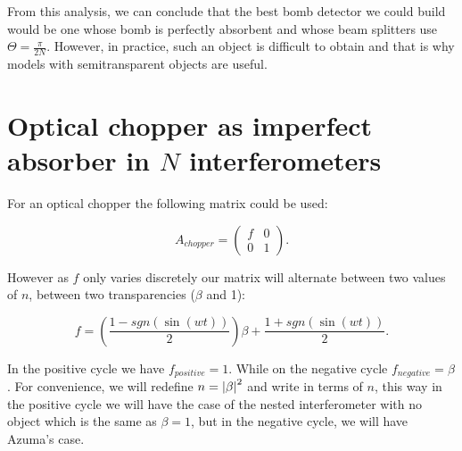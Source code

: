 \documentclass{book}
\begin{document}
From this analysis, we can conclude that the best bomb detector we could build would be one whose bomb is perfectly absorbent and whose beam splitters use $\Theta=\frac{\pi}{2 N}$. However, in practice, such an object is difficult to obtain and that is why models with semitransparent objects are useful.
 
\section[Optical chopper]{Optical chopper as imperfect absorber in $N$ interferometers}
For an optical chopper the following matrix could be used:

\begin{equation}
A_{chopper}=\begin{pmatrix} f & 0 \\ 0 & 1 \end{pmatrix}.
\end{equation}

However as $f$ only varies discretely our matrix will alternate between two values of $n$, between two transparencies ($\beta$ and 1):

\begin{equation}
f=\left(\frac{1-sgn(\sin(wt))}{2} \right)\beta+\frac{1+sgn(\sin(wt))}{2}.
\end{equation}

In the positive cycle we have $f_{positive}=1$. While on the negative cycle $f_{negative}=\beta$. For convenience, we will redefine $n=\abs{\beta}^{2}$ and write in terms of $n$, this way in the positive cycle we will have the case of the nested interferometer with no object which is the same as  $\beta=1$, but in the negative cycle, we will have  Azuma's case.
\end{document}
